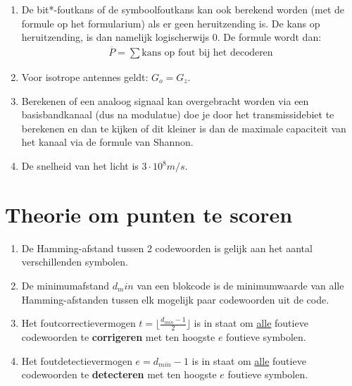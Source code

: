 \documentclass[12pt,a4paper]{article}
\begin{document}
\begin{enumerate}
\item De bit*-foutkans of de symboolfoutkans kan ook berekend worden (met de formule op het formularium) als er geen heruitzending is. De kans op heruitzending, is dan namelijk logischerwijs $0$.
De formule wordt dan:
\begin{align*}
\overline{P} = \sum\text{kans op fout bij het decoderen}
\end{align*}

\item Voor isotrope antennes geldt: $G_o = G_z$.

\item Berekenen of een analoog signaal kan overgebracht worden via een basisbandkanaal (dus na modulatue) doe je door het transmissidebiet te berekenen en dan te kijken of dit kleiner is dan de maximale capaciteit van het kanaal via de formule van Shannon.

\item De snelheid van het licht is $3 \cdot 10^8 m/s$.

\end{enumerate}

\section*{Theorie om punten te scoren}
\begin{enumerate}
\item De Hamming-afstand tussen 2 codewoorden is gelijk aan het aantal verschillenden symbolen.
\item De minimumafstand $d_min$ van een blokcode is de minimumwaarde van alle Hamming-afstanden tussen elk mogelijk paar codewoorden uit de code.
\item Het foutcorrectievermogen $t= \lfloor \frac{d_{min}-1}{2} \rfloor$ is in staat om \underline{alle} foutieve codewoorden te \textbf{corrigeren} met ten hoogste $e$ foutieve symbolen.
\item Het foutdetectievermogen $e=d_{min}-1$ is in staat om \underline{alle} foutieve codewoorden te \textbf{detecteren} met ten hoogste $e$ foutieve symbolen.
\end{enumerate}
\end{document}
